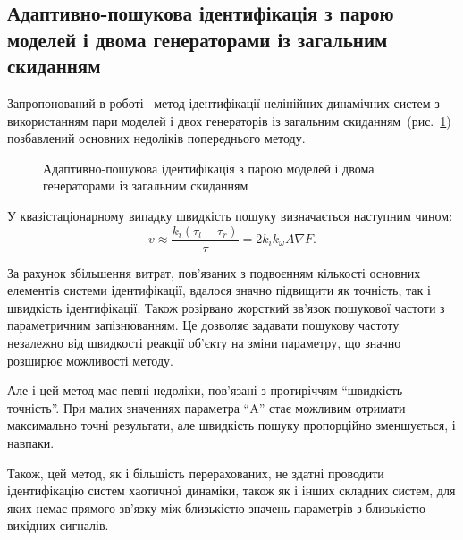 
\subsection{Адаптивно-пошукова ідентифікація з парою моделей і двома генераторами із загальним скиданням}%

Запропонований в роботі~\cite{atu_phd_thesis} метод ідентифікації
нелінійних динамічних систем з використанням пари моделей
і двох генераторів із загальним скиданням~(рис.~\ref{atu:f:apid2})
позбавлений основних недоліків попереднього методу.

\begin{figure}[htb!]
\begin{center}

\end{center}
\caption{Адаптивно-пошукова ідентифікація з парою моделей і двома генераторами із загальним скиданням}
\label{atu:f:apid2}
\end{figure}


У квазістаціонарному випадку швидкість пошуку визначається
наступним чином:
%
\begin{equation}
\label{atu:eq:vugpk2}
  v
  \approx
  \frac{k_i (\tau_l - \tau_r)}{\tau}
  =
  2 k_i k_\omega A \nabla F .
\end{equation}

За рахунок збільшення витрат, пов'язаних з подвоєнням кількості
основних елементів системи ідентифікації, вдалося значно
підвищити як точність, так і швидкість ідентифікації.
Також розірвано жорсткий зв'язок пошукової частоти з
параметричним запізнюванням. Це дозволяє задавати
пошукову частоту незалежно від швидкості реакції об'єкту
на зміни параметру, що значно розширює можливості методу.

Але і цей метод має певні недоліки, пов'язані
з протиріччям ``швидкість -- точність''.
При малих значеннях параметра ``A''
стає можливим отримати максимально точні результати,
але швидкість пошуку пропорційно зменшується,
і навпаки.

Також, цей метод, як і більшість перерахованих,
не здатні проводити ідентифікацію  систем хаотичної динаміки,
також як і інших складних систем, для яких немає
прямого зв'язку між
близькістю значень параметрів з близькістю вихідних сигналів.











